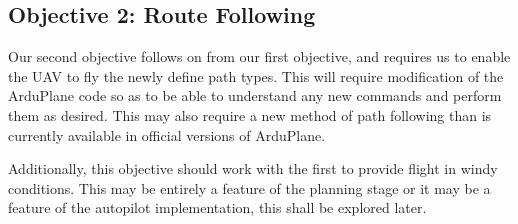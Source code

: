 \subsection{Objective 2: Route Following}
\label{intro:obj2}

Our second objective follows on from our first objective, and requires us to enable the UAV to fly the newly define path types. This will require modification of the ArduPlane code so as to be able to understand any new commands and perform them as desired. This may also require a new method of path following than is currently available in official versions of ArduPlane. 

Additionally, this objective should work with the first to provide flight in windy conditions. This may be entirely a feature of the planning stage or it may be a feature of the autopilot implementation, this shall be explored later.


